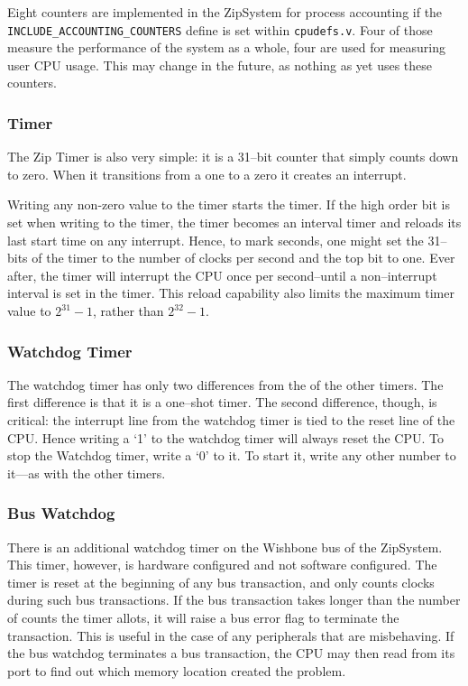 \documentclass{gqtekspec}
\begin{document}
Eight counters are implemented in the ZipSystem for process accounting if
the {\tt INCLUDE\_ACCOUNTING\_COUNTERS} define is set within {\tt cpudefs.v}.
Four of those measure the performance of the system as a whole, four are
used for measuring user CPU usage.
This may change in the future, as nothing as yet uses these counters.

\subsubsection{Timer}

The Zip Timer is also very simple: it is a 31--bit counter that simply counts
down to zero.  When it transitions from a one to a zero it creates an interrupt.

Writing any non-zero value to the timer starts the timer.  If the high order
bit is set when writing to the timer, the timer becomes an interval timer and
reloads its last start time on any interrupt.  Hence, to mark seconds, one
might set the 31--bits of the timer to the number of clocks per second and the
top bit to one.  Ever after, the timer will interrupt the CPU once per
second--until a non--interrupt interval is set in the timer.  This reload
capability also limits the maximum timer value to $2^{31}-1$, rather than
$2^{32}-1$.

\subsubsection{Watchdog Timer}

The watchdog timer has only two differences from the of the other timers.
The first difference is that it is a one--shot timer.  The second difference,
though, is critical: the interrupt line from the watchdog timer is tied to the
reset line of the CPU.  Hence writing a `1' to the watchdog timer will always
reset the CPU.  To stop the Watchdog timer, write a `0' to it.  To start it,
write any other number to it---as with the other timers.


\subsubsection{Bus Watchdog}
There is an additional watchdog timer on the Wishbone bus of the ZipSystem. 
This timer,
however, is hardware configured and not software configured.  The timer is
reset at the beginning of any bus transaction, and only counts clocks during
such bus transactions.  If the bus transaction takes longer than the number
of counts the timer allots, it will raise a bus error flag to terminate the
transaction.  This is useful in the case of any peripherals that are
misbehaving.  If the bus watchdog terminates a bus transaction, the CPU may
then read from its port to find out which memory location created the problem.
\end{document}
